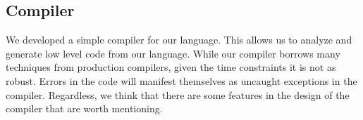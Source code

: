 \subsection{Compiler}

We developed a simple compiler for our language.
This allows us to
	analyze and generate low level code from our language.
While our compiler borrows many techniques from production compilers,
	given the time constraints it is not as robust.
Errors in the code will manifest themselves as uncaught exceptions
	in the compiler.
Regardless, we think that there are some features in the design of
	the compiler that are worth mentioning.








